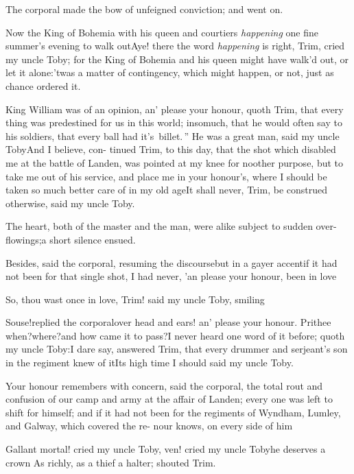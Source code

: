 \documentclass{article}
\begin{document}
The corporal made the bow of unfeigned conviction; and
went on.

Now the King of Bohemia with his queen and courtiers
\textit{happening} one fine summer’s evening to walk
out\tsh Aye! there the word \textit{happening} is right,
Trim, cried my uncle Toby; for the King of
Bohemia and his queen might have walk’d out, or let it
alone:\tsh ’twas a matter of contingency, which
might happen, or not, just as chance ordered it.

King William was of an opinion, an’ please your
honour, quoth Trim, that every thing was predestined for us
in this world; insomuch, that he would often say to his soldiers,
that \lqq every ball had it’s\sic\ billet.\,” He was a great man,
said my uncle Toby\tsh And I believe, con- tinued
Trim, to this day, that the shot which disabled me at the
battle of Landen, was pointed at my knee for no\break other
purpose, but to take me out of his service, and place me in your
honour’s, where I should be taken so much better care of in
my old age\tsh It shall never, Trim, be construed
otherwise, said my uncle Toby.

The heart, both of the master and the man, were alike subject to
sudden over-flowings;\tsh a short silence ensued.

Besides, said the corporal, resuming the discourse\tsk but in
a gayer accent\tsh if it had not been for that single
shot, I had never, ’an please your honour, been in
love\tsh{}

So, thou wast once in love, Trim! said my uncle Toby, smiling\tsh

Souse!\@ replied the corporal\tsk over head and ears! an’ please your honour. Prithee
when?\@ where?\tsk and how came it to pass?\tsk I never heard one word of it before; quoth
my uncle Toby:\tsh I dare say, answered Trim, that every drummer and
serjeant’s son in the regiment knew of it\tsh Its high time I should \tsh said my
uncle Toby.

Your honour remembers with concern, said the corporal, the total rout and confusion
of our camp and army at the affair of Landen; every one was left to shift for
himself; and if it had not been for the regiments of Wyndham, Lumley, and Galway,
which covered the re- 
nour knows, on every side of him\tsh

Gallant mortal! cried my uncle Toby, 
ven! cried my uncle Toby\tsk he deserves 
a crown \tsh As richly, as a thief a halter; shouted Trim.
\end{document}

